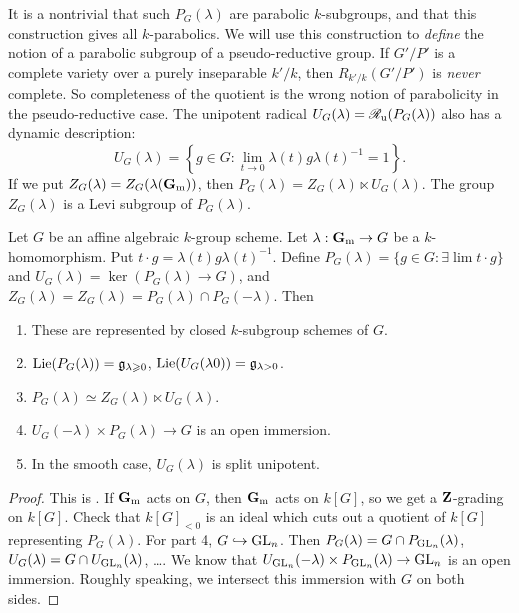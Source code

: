 It is a nontrivial that such $P_G(\lambda)$ are parabolic $k$-subgroups, and 
that this construction gives all $k$-parabolics. We will use this construction to 
\emph{define} the notion of a parabolic subgroup of a pseudo-reductive group. 
If $G'/P'$ is a complete variety over a purely inseparable $k'/k$, then 
$R_{k'/k}(G'/P')$ is \emph{never} complete. So completeness of the quotient is 
the wrong notion of parabolicity in the pseudo-reductive case. The unipotent 
radical $U_G(\lambda)=\mathscr{R}_{\mathrm{u}}(P_G(\lambda))$ also has a dynamic description: 
\[
  U_G(\lambda) = \left\{g\in G:\lim_{t\to 0} \lambda(t) g \lambda(t)^{-1} = 1\right\} .
\]
If we put $Z_G(\lambda) = Z_G(\lambda(\mathbf{G}_{\mathrm{m}}))$, then 
$P_G(\lambda)=Z_G(\lambda)\ltimes U_G(\lambda)$. The group $Z_G(\lambda)$ is a 
Levi subgroup of $P_G(\lambda)$. 

\begin{theo}
Let $G$ be an affine algebraic $k$-group scheme. Let $\lambda:\mathbf{G}_{\mathrm{m}} \to G$ be 
a $k$-homomorphism. Put $t\cdot g=\lambda(t) g \lambda(t)^{-1}$. Define 
$ P_G(\lambda)=\{g\in G:\exists \lim t\cdot g\}$ and 
$ U_G(\lambda)=\ker( P_G(\lambda) \to G)$, and 
$ Z_G(\lambda)=Z_G(\lambda) = P_G(\lambda)\cap P_G(-\lambda)$. Then 
\begin{enumerate}
  \item These are represented by closed $k$-subgroup schemes of $G$. 
  \item $\operatorname{Lie}(P_G(\lambda)) = \mathfrak{g}_{\lambda\geqslant 0}$, $\operatorname{Lie}(U_G(\lambda0)) = \mathfrak{g}_{\lambda>0}$. 
  \item $P_G(\lambda)\simeq Z_G(\lambda)\ltimes U_G(\lambda)$. 
  \item $U_G(-\lambda)\times P_G(\lambda) \to G$ is an open immersion. 
  \item In the smooth case, $U_G(\lambda)$ is split unipotent. 
\end{enumerate}
\end{theo}
\begin{proof}
This is \cite[2.1.8]{cgp10}. If $\mathbf{G}_{\mathrm{m}}$ acts on $G$, then $\mathbf{G}_{\mathrm{m}}$ 
acts on $k[G]$, so we get a $\mathbf{Z}$-grading on $k[G]$. Check that $k[G]_{<0}$ is 
an ideal which cuts out a quotient of $k[G]$ representing $P_G(\lambda)$. For 
part 4, $G\hookrightarrow \operatorname{GL}_n$. Then 
$P_G(\lambda)=G\cap P_{\operatorname{GL}_n}(\lambda)$, 
$U_G(\lambda)=G\cap U_{\operatorname{GL}_n}(\lambda)$, \ldots. We know that 
$U_{\operatorname{GL}_n}(-\lambda)\times P_{\operatorname{GL}_n}(\lambda)\to \operatorname{GL}_n$ 
is an open immersion. Roughly speaking, we intersect this immersion with $G$ on 
both sides. 
\end{proof}

